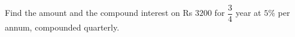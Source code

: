 Find the amount and the compound interest on Rs $3200$ for $\dfrac34$ year at $5\%$ per annum, compounded quarterly.
